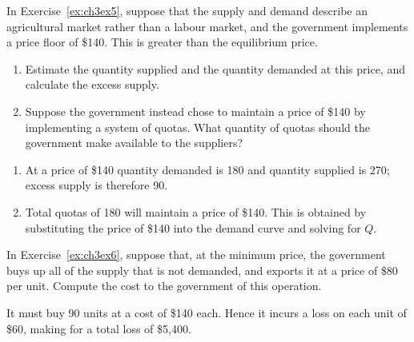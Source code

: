\begin{enumialphparenastyle}
\begin{ex}\label{ex:ch3ex6}
In Exercise~\ref{ex:ch3ex5}, suppose that the supply and demand describe an agricultural market rather than a labour market, and the government implements a price floor of \$140. This is greater than the equilibrium price.
\begin{enumerate}
	\item	Estimate the quantity supplied and the quantity demanded at this price, and calculate the excess supply.
	\item	Suppose the government instead chose to maintain a price of \$140 by implementing a system of quotas. What quantity of quotas should the government make available to the suppliers?
\end{enumerate}
\begin{sol}
\begin{enumerate}
	\item	At a price of \$140 quantity demanded is 180 and quantity supplied is 270; excess supply is therefore 90.
	\item	Total quotas of 180 will maintain a price of \$140. This is obtained by substituting the price of \$140 into the demand curve and solving for $Q$.
\end{enumerate}
\end{sol}
\end{ex}

\begin{ex}\label{ex:ch3ex7}
In Exercise~\ref{ex:ch3ex6}, suppose that, at the minimum price, the government buys up all of the supply that is not demanded, and exports it at a price of \$80 per unit. Compute the cost to the government of this operation.
\begin{sol}
	It must buy 90 units at a cost of \$140 each. Hence it incurs a loss on each unit of \$60, making for a total loss of \$5,400.
	
\end{sol}
\end{ex}


\end{enumialphparenastyle}
